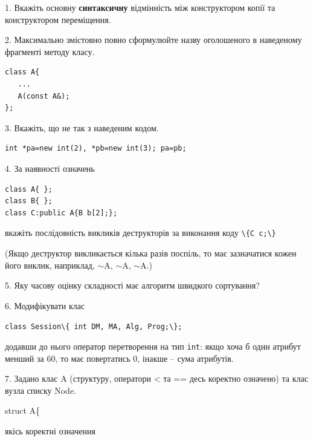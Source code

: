 \documentclass[12pt, ukrainian]{article}
\def\code#1{\Verb!#1!}
\begin{document}
{%
1. Вкажіть основну \textbf{синтаксичну} відмінність між конструктором копії та конструктором переміщення.%
\par
\vspace{2mm}
2. Максимально змістовно повно сформулюйте назву оголошеного в наведеному фрагменті методу класу.
\vspace{-3mm}
\begin{verbatim}class A{
   ...
   A(const A&);
};\end{verbatim}
\vspace{-3mm}
\par
\vspace{2mm}
3. Вкажіть, що не так з наведеним кодом.
\vspace{-3mm}
\begin{verbatim}int *pa=new int(2), *pb=new int(3); pa=pb;\end{verbatim}
\vspace{-3mm}
\par
\vspace{2mm}
4. За наявності означень
\vspace{-3mm}
\begin{verbatim}
class A{ };
class B{ };
class C:public A{B b[2];};\end{verbatim}
\vspace{-3mm}
вкажіть послідовність викликів деструкторів за виконання коду \code{\{C c;\}} 

(Якщо деструктор викликається кілька разів поспіль, то має зазначатися кожен його виклик, наприклад, $\sim$A, $\sim$A, $\sim$A.)

\vspace{2mm}
5. Яку часову оцінку складності має алгоритм швидкого сортування?
\par
\vspace{2mm}
6. Модифікувати клас 

\qquad\code{class Session\{ int DM, MA, Alg, Prog;\};} 


додавши до нього оператор перетворення на тип \code{int}: якщо хоча б один атрибут менший за 60, то має повертатись 0, інакше -- сума атрибутів.%
\par
\vspace{2mm}
7. 
Задано клас A (структуру, оператори < та == десь коректно означено) та клас вузла списку Node.

struct A\{

\quad  якісь коректні означення 

}
\end{document}
